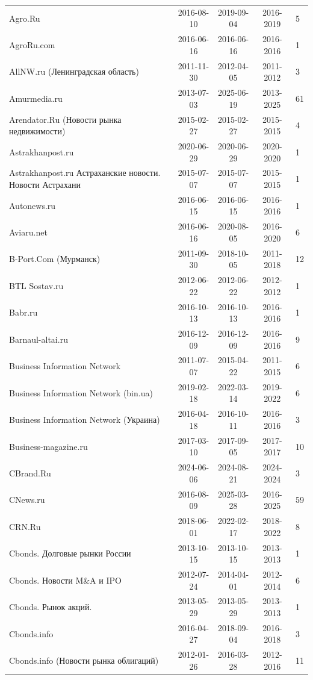 \begin{longtable}{p{6cm}cccp{2cm}}
Agro.Ru & 2016-08-10 & 2019-09-04 & 2016-2019 & 5\\
AgroRu.com & 2016-06-16 & 2016-06-16 & 2016-2016 & 1\\
AllNW.ru (Ленинградская область) & 2011-11-30 & 2012-04-05 & 2011-2012 & 3\\
Amurmedia.ru & 2013-07-03 & 2025-06-19 & 2013-2025 & 61\\
Arendator.Ru (Новости рынка недвижимости) & 2015-02-27 & 2015-02-27 & 2015-2015 & 4\\
Astrakhanpost.ru & 2020-06-29 & 2020-06-29 & 2020-2020 & 1\\
Astrakhanpost.ru Астраханские новости. Новости Астрахани & 2015-07-07 & 2015-07-07 & 2015-2015 & 1\\
Autonews.ru & 2016-06-15 & 2016-06-15 & 2016-2016 & 1\\
Aviaru.net & 2016-06-16 & 2020-08-05 & 2016-2020 & 6\\
B-Port.Com (Мурманск) & 2011-09-30 & 2018-10-05 & 2011-2018 & 12\\
BTL Sostav.ru & 2012-06-22 & 2012-06-22 & 2012-2012 & 1\\
Babr.ru & 2016-10-13 & 2016-10-13 & 2016-2016 & 1\\
Barnaul-altai.ru & 2016-12-09 & 2016-12-09 & 2016-2016 & 9\\
Business Information Network & 2011-07-07 & 2015-04-22 & 2011-2015 & 6\\
Business Information Network (bin.ua) & 2019-02-18 & 2022-03-14 & 2019-2022 & 6\\
Business Information Network (Украина) & 2016-04-18 & 2016-10-11 & 2016-2016 & 3\\
Business-magazine.ru & 2017-03-10 & 2017-09-05 & 2017-2017 & 10\\
CBrand.Ru & 2024-06-06 & 2024-08-21 & 2024-2024 & 3\\
CNews.ru & 2016-08-09 & 2025-03-28 & 2016-2025 & 59\\
CRN.Ru & 2018-06-01 & 2022-02-17 & 2018-2022 & 8\\
Cbonds. Долговые рынки России & 2013-10-15 & 2013-10-15 & 2013-2013 & 1\\
Cbonds. Новости M\&A и IPO & 2012-07-24 & 2014-04-01 & 2012-2014 & 6\\
Cbonds. Рынок акций. & 2013-05-29 & 2013-05-29 & 2013-2013 & 1\\
Cbonds.info & 2016-04-27 & 2018-09-04 & 2016-2018 & 3\\
Cbonds.info (Новости рынка облигаций) & 2012-01-26 & 2016-03-28 & 2012-2016 & 11\\

\end{longtable}
